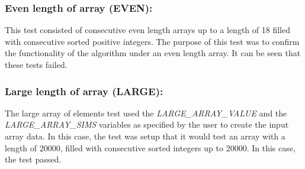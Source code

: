 \documentclass[12pt]{article}
\begin{document}
\subsubsection{Even length of array (EVEN):}
This test consisted of consecutive even length arrays up to a  length of 18 filled with consecutive sorted positive integers. The purpose of this test was to confirm the functionality of the algorithm under an even length array. It can be seen that these tests failed.
\begin{table}[H]
	\centering
	\caption{Even length of array elements test results.}
	\label{tab:even}
\end{table}

\subsubsection{Large length of array (LARGE): }
The large array of elements test used the \textit{LARGE\_ARRAY\_VALUE} and the \textit{LARGE\_ARRAY\_SIMS} variables as specified by the user to create the input array data. In this case, the test was setup that it would test an array with a length of 20000, filled with consecutive sorted integers up to 20000. In this case, the test passed.
\begin{table}[H]
	\centering
	\caption{Large length of array elements test results.}
	\label{my-label}
\end{table}
\end{document}
